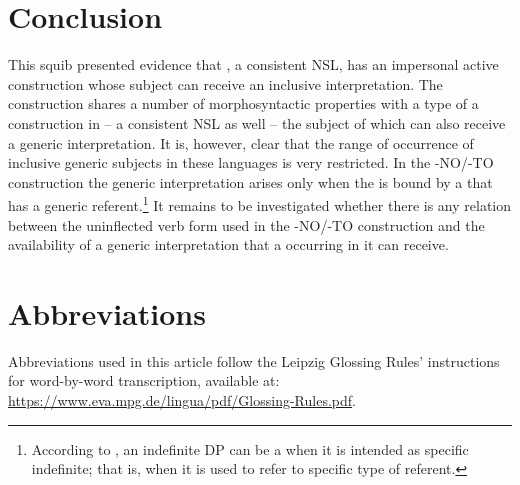 \documentclass[output=paper]{LSP/langsci}
\begin{document}
\section{Conclusion}
This squib presented evidence that , a consistent NSL, has an impersonal active construction whose subject can receive an inclusive interpretation. The  construction shares a number of morphosyntactic properties with a type of a  construction in  \citep{FassiFehri2009} – a consistent NSL as well – the subject of which can also receive a generic interpretation. It is, however, clear that the range of occurrence of inclusive generic subjects in these languages is very restricted. In the -NO/-TO construction the generic interpretation arises only when the  is bound by a  that has a generic referent.\footnote{According to \citet[707]{Frascarelli2007}, an indefinite DP can be a  when it is intended as specific indefinite; that is, when it is used to refer to specific type of referent.} It remains to be investigated whether there is any relation between the uninflected verb form used in the -NO/-TO construction and the availability of a generic interpretation that a  occurring in it can receive.



\section*{Abbreviations}
Abbreviations used in this article follow the Leipzig Glossing Rules’ instructions for word-by-word transcription, available at: \url{https://www.eva.mpg.de/lingua/pdf/Glossing-Rules.pdf}.

\sloppy
\printbibliography[heading=subbibliography,notkeyword=this]
\end{document}
